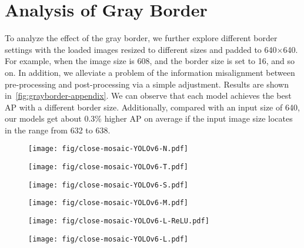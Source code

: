 \documentclass[10pt,twocolumn,letterpaper]{article}
\begin{document}
\section{Analysis of Gray Border}\label{app:gray-border}
To analyze the effect of the gray border, we further explore different border settings with the loaded images resized to different sizes and padded to 640$\times$640. For example, when the image size is 608, and the border size is set to 16, and so on. In addition, we alleviate a problem of the information misalignment between pre-processing and post-processing via a simple adjustment. Results are shown in~\cref{fig:grayborder-appendix}. We can observe that each model achieves the best AP with a different border size. Additionally, compared with an input size of 640, our models get about 0.3\% higher AP on average if the input image size locates in the range from 632 to 638. 

\begin{figure*}[ht]
  \centering
 \begin{subfigure}{0.3\textwidth}
    \texttt{[image: fig/close-mosaic-YOLOv6-N.pdf]}
 \caption{}
  \end{subfigure}
   \begin{subfigure}{0.3\textwidth}
       \texttt{[image: fig/close-mosaic-YOLOv6-T.pdf]}
       \caption{}
   \end{subfigure}
   \begin{subfigure}{0.3\textwidth}
  \texttt{[image: fig/close-mosaic-YOLOv6-S.pdf]}
  \caption{}
 \end{subfigure}
 \begin{subfigure}{0.3\textwidth}
  \texttt{[image: fig/close-mosaic-YOLOv6-M.pdf]}
  \caption{}
  \end{subfigure}
  \begin{subfigure}{0.3\textwidth}
    \texttt{[image: fig/close-mosaic-YOLOv6-L-ReLU.pdf]}
    \caption{}
    \end{subfigure}
  \begin{subfigure}{0.3\textwidth}
    \texttt{[image: fig/close-mosaic-YOLOv6-L.pdf]}
    \caption{}
    \end{subfigure}
  \caption{Analysis of the gray border problem.}
  \label{fig:grayborder-appendix}
\end{figure*}
\end{document}
